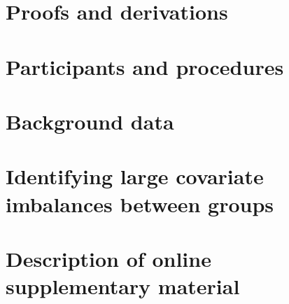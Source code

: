 \documentclass[12pt]{article}
\begin{document}
\begin{appendices}

  \startcontents[sections]

  \clearpage

\section{Proofs and derivations}

    \label{appendix:theory}

    


    \clearpage

\section{Participants and procedures}

    \label{appendix:participants}

    


    \clearpage

\section{Background data}

    \label{appendix:background}

    


    \clearpage

\section{Identifying large covariate imbalances between groups}

    \label{appendix:largeImbalances}

    


    \clearpage

\section{Description of online supplementary material}

  \label{appendix:onlineSupplementaryMaterial}

  

\end{appendices}
\end{document}
